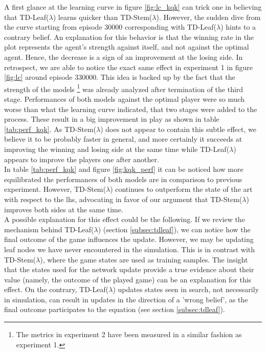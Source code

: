 A first glance at the learning curve in figure \ref{fig:lc_kqk} can trick one in believing that TD-Leaf($\lambda$) learns quicker than TD-Stem($\lambda$). However, the sudden dive from the curve starting from episode 30000 corresponding with TD-Leaf($\lambda$) hints to a contrary belief. An explanation for this behavior is that the winning rate in the plot represents the agent's strength against itself, and not against the optimal agent. Hence, the decrease is a sign of an improvement at the losing side. In retrospect, we are able to notice the exact same effect in experiment 1 in figure \ref{fig:lc} around episode 330000. This idea is backed up by the fact that the strength of the models \footnote{The metrics in experiment 2 have been measured in a similar fashion as experiment 1.} was already analyzed after termination of the third stage. Performances of both models against the optimal player were so much worse than what the learning curve indicated, that two stages were added to the process. These result in a big improvement in play as shown in table \ref{tab:perf_kqk}. As TD-Stem($\lambda$) does not appear to contain this subtle effect, we believe it to be probably faster in general, and more certainly it succeeds at improving the winning and losing side at the same time while TD-Leaf($\lambda$) appears to improve the players one after another.\\
In table \ref{tab:perf_kqk} and figure \ref{fig:kqk_perf} it can be noticed how more equilibrated the performances of both models are in comparison to previous experiment. However, TD-Stem($\lambda$) continues to outperform the state of the art with respect to the \gls{lhs}, advocating in favor of our argument that TD-Stem($\lambda$) improves both sides at the same time.\\
A possible explanation for this effect could be the following. If we review the mechanism behind TD-Leaf($\lambda$) (section \ref{subsec:tdleaf}), we can notice how the final outcome of the game influences the update. However, we may be updating  leaf nodes we have never encountered in the simulation. This is in contrast with TD-Stem($\lambda$), where the game states are used as training samples.
The insight that the states used for the network update provide a true evidence about their value (namely, the outcome of the played game) can be an explanation for this effect. On the contrary, TD-Leaf($\lambda$) updates states seen in search, not necessarily in simulation, can result in updates in the direction of a 'wrong belief', as the final outcome participates to the equation (see section \ref{subsec:tdleaf}).\\

